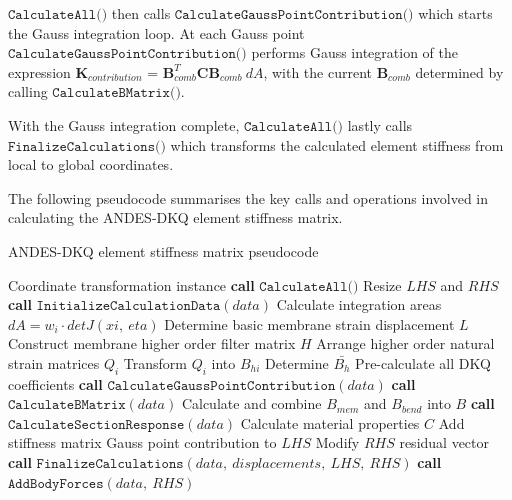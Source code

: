 $\texttt{CalculateAll()}$ then calls $\texttt{CalculateGaussPointContribution()}$ which starts the Gauss integration loop. At each Gauss point $\texttt{CalculateGaussPointContribution()}$ performs Gauss integration of the expression $\textbf{K}_{contribution}$ = $\textbf{B}_{comb}^T \textbf{C} \textbf{B}_{comb}\  dA$, with the current $\textbf{B}_{comb}$ determined by calling $\texttt{CalculateBMatrix()}$.

With the Gauss integration complete, $\texttt{CalculateAll()}$ lastly calls $\texttt{FinalizeCalculations()}$ which transforms the calculated element stiffness from local to global coordinates.

The following pseudocode summarises the key calls and operations involved in calculating the ANDES-DKQ element stiffness matrix.

\begin{algorithm}
	\onehalfspacing
	\caption{ANDES-DKQ element stiffness matrix pseudocode}\label{ANDES-DKQ element stiffness matrix}
	\begin{algorithmic}[1]
		\Require Coordinate transformation instance
		\State \textbf{call} $\texttt{CalculateAll()}$
		\State Resize $LHS$ and $RHS$
		\State \textbf{call} $\texttt{InitializeCalculationData}(data)$
		\State \hspace{\algorithmicindent}Calculate integration areas $dA = w_i \cdot detJ(xi,\ eta)$
		\State \hspace{\algorithmicindent}Determine basic membrane strain displacement $L$
		\State \hspace{\algorithmicindent}Construct membrane higher order filter matrix $H$
		\State \hspace{\algorithmicindent}Arrange higher order natural strain matrices $Q_i$
		\State \hspace{\algorithmicindent}Transform $Q_i$ into $B_{hi}$
		\State \hspace{\algorithmicindent}Determine $\bar{B_h}$
		\State \hspace{\algorithmicindent}Pre-calculate all DKQ coefficients
		\State \textbf{call} $\texttt{CalculateGaussPointContribution}(data)$
		\State \hspace{\algorithmicindent}\textbf{call} $\texttt{CalculateBMatrix}(data)$
		\State \hspace{\algorithmicindent}\hspace{\algorithmicindent} Calculate and combine $B_{mem}$ and $B_{bend}$ into $B$
		\State \hspace{\algorithmicindent}\textbf{call} $\texttt{CalculateSectionResponse}(data)$
		\State \hspace{\algorithmicindent}\hspace{\algorithmicindent} Calculate material properties $C$
		\State \hspace{\algorithmicindent}Add stiffness matrix Gauss point contribution to $LHS$
		\EndWhile
		\State Modify $RHS$ residual vector
		\State \textbf{call} $\texttt{FinalizeCalculations}(data,\ displacements,\ LHS,\ RHS)$
		\State \textbf{call} $\texttt{AddBodyForces}(data,\ RHS)$
	\end{algorithmic}
\end{algorithm}

